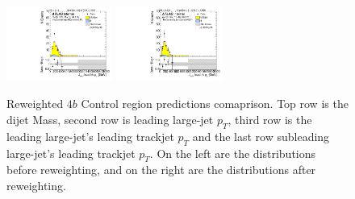\begin{figure}[htbp!]
\begin{center}
\includegraphics[width=0.31\textwidth,angle=-90]{figures/boosted/Prereweight/Moriond_FourTag_Control_sublHCand_trk0_Pt.pdf}
\includegraphics[width=0.31\textwidth,angle=-90]{figures/boosted/Control/b77_FourTag_Control_sublHCand_trk0_Pt.pdf}\\
\caption{Reweighted $4b$ Control region predictions comaprison. Top row is the dijet Mass, second row is leading large-\R jet $p_{T}$, third row is the leading large-\R jet's leading trackjet $p_T$ and the last row subleading large-\R jet's leading trackjet $p_T$. On the left are the distributions before reweighting, and on the right are the distributions after reweighting.}
\label{fig:rw-4b-comp-cr}
\end{center}
\end{figure}

\clearpage
